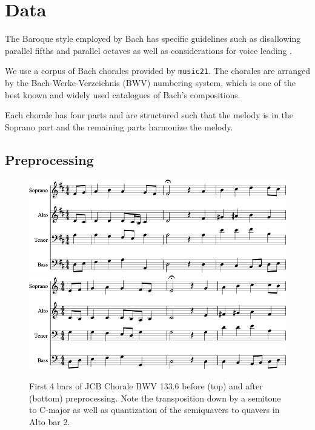 \documentclass[dissertation.tex]{subfiles}
\begin{document}
\chapter{Data}

The Baroque style employed by Bach has specific guidelines
such as disallowing parallel fifths and parallel octaves as well as
considerations for voice leading \cite{piston1978harmony}.



We use a corpus of Bach chorales provided by \texttt{music21}. The chorales are
arranged by the Bach-Werke-Verzeichnis (BWV) numbering system, which is one of
the best known and widely used catalogues of Bach's compositions.

Each chorale has four parts and are structured such that the melody is in
the Soprano part and the remaining parts harmonize the melody.

\section{Preprocessing}

\begin{figure}[htbp]
    \centering
    \includegraphics[width=1.0\linewidth]{Figures/bwv133-6-original-score-1.png}
    \includegraphics[width=1.0\linewidth]{Figures/bwv133-6-preproc-score-1.png}
    \caption{First 4 bars of JCB Chorale BWV 133.6 before (top) and after (bottom) preprocessing. Note
    the transposition down by a semitone to C-major as well as quantization of the
    semiquavers to quavers in Alto bar 2.}
    \label{fig:score-effects-preproc}
\end{figure}
\end{document}
